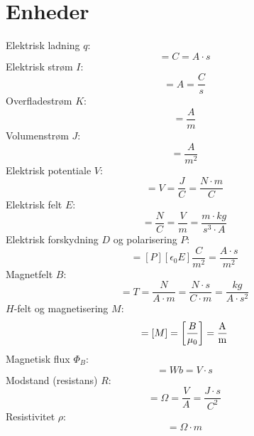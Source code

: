 \documentclass[]{article}
\theoremstyle{definition}
\begin{document}
\section{Enheder}
Elektrisk ladning $q$:
\begin{equation*}
	[q] = \unit{C} = \unit{A \cdot s}
\end{equation*}
Elektrisk strøm $I$:
\begin{equation*}
	[I] = \unit{A} = \unit{\frac{C}{s}}
\end{equation*}
Overfladestrøm $K$:
\begin{equation*}
	[K] = \unit{\frac{A}{m}}
\end{equation*}
Volumenstrøm $J$:
\begin{equation*}
	[J] = \unit{\frac{A}{m^2}}
\end{equation*}
Elektrisk potentiale $V$:
\begin{equation*}
	[V] = \unit{V} = \unit{\frac{J}{C}} = \unit{\frac{N \cdot m}{C}}
\end{equation*}
Elektrisk felt $E$:
\begin{equation*}
	[E] = \unit{\frac{N}{C}} = \unit{\frac{V}{m}} = \unit{\frac{m\cdot kg}{s^3 \cdot A}}
\end{equation*}
Elektrisk forskydning $D$ og polarisering $P$:
\begin{equation*}
	[D] = [P] [\epsilon_0 E] \unit{\frac{C}{m^2}} = \unit{\frac{A \cdot s}{m^2}}
\end{equation*}
Magnetfelt $B$:
\begin{equation*}
	[B] = \unit{T} = \unit{\frac{N}{A \cdot m} =  \unit{\frac{N \cdot s}{C \cdot m}} = \unit{\frac{kg}{A \cdot s^2}}}
\end{equation*}
$H$-felt og magnetisering $M$:
\begin{equation*}
	[H] = [M] = \qty[\frac{B}{\mu_0}] = \unit{\frac{A}{m}}
\end{equation*}
Magnetisk flux $ \Phi_B$:
\begin{equation*}
	[\Phi_B] = \unit{Wb} = \unit{V \cdot s}
\end{equation*}
Modstand (resistans) $R$:
\begin{equation*}
	[R] = \unit{\Omega} = \unit{\frac{V}{A}} = \unit{\dfrac{J \cdot s}{C^2}}
\end{equation*}
Resistivitet $\rho$:
\begin{equation*}
	[\rho] = \unit{\Omega \cdot m}
\end{equation*}
\end{document}
